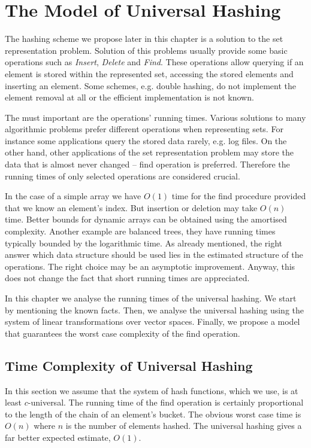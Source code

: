 
\chapter{The Model of Universal Hashing}
\label{chapter-proposed-model}

The hashing scheme we propose later in this chapter is a solution to the set representation problem. Solution of this problems usually provide some basic operations such as \emph{Insert}, \emph{Delete} and \emph{Find}. These operations allow querying if an element is stored within the represented set, accessing the stored elements and inserting an element. Some schemes, e.g. double hashing, do not implement the element removal at all or the efficient implementation is not known.

The must important are the operations' running times. Various solutions to many algorithmic problems prefer different operations when representing sets. For instance some applications query the stored data rarely, e.g. log files. On the other hand, other applications of the set representation problem may store the data that is almost never changed -- find operation is preferred. Therefore the running times of only selected operations are considered crucial. 

In the case of a simple array we have $O(1)$ time for the find procedure provided that we know an element's index. But insertion or deletion may take $O(n)$ time. Better bounds for dynamic arrays can be obtained using the amortised complexity. Another example are balanced trees, they have running times typically bounded by the logarithmic time. As already mentioned, the right answer which data structure should be used lies in the estimated structure of the operations. The right choice may be an asymptotic improvement. Anyway, this does not change the fact that short running times are appreciated.

In this chapter we analyse the running times of the universal hashing. We start by mentioning the known facts. Then, we analyse the universal hashing using the system of linear transformations over vector spaces. Finally, we propose a model that guarantees the worst case complexity of the find operation.

\section{Time Complexity of Universal Hashing}
In this section we assume that the system of hash functions, which we use, is at least $c$-universal. The running time of the find operation is certainly proportional to the length of the chain of an element's bucket. The obvious worst case time is $O(n)$ where $n$ is the number of elements hashed. The universal hashing gives a far better expected estimate, $O(1)$.

